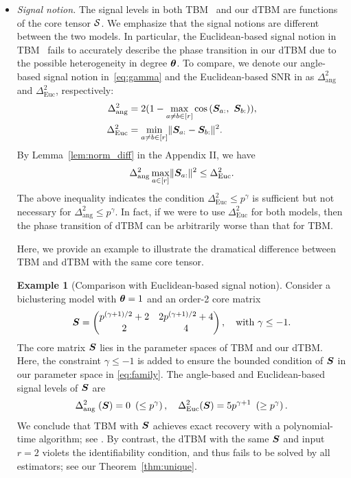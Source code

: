 \documentclass[journal]{IEEEtran}
\theoremstyle{definition}
\theoremstyle{definition}
\newtheorem{example}{Example}
\newcommand{\of}[1]{\left(#1\right)}
\begin{document}
\begin{itemize}[wide]
    \item \textit{Signal notion.} The signal levels in both TBM~\citep{han2020exact} and our dTBM are functions of the core tensor $\mathcal{S}$. We emphasize that the signal notions are different between the two models. In particular, the Euclidean-based signal notion in TBM~\cite{han2020exact} fails to accurately describe the phase transition in our dTBM due to the possible heterogeneity in degree $\boldsymbol{\theta}$. To compare, we denote our angle-based signal notion in~\eqref{eq:gamma} and the Euclidean-based SNR in \cite{han2020exact} as $\Delta_{\text{ang}}^2$ and $\Delta_{\text{Euc}}^2$, respectively:
    \begin{align}
        \Delta_{\text{ang}}^2 &=  2(1 - \max_{a \neq b\in [r]}\cos \of{\mS_{a:},\  \mS_{b:}} ), \\ 
 \Delta_{\text{Euc}}^2 &= \min_{a \neq b \in [r]} \onormSize{}{\mS_{a:} - \mS_{b:}}^2.
    \end{align}
By Lemma~\ref{lem:norm_diff} in the Appendix II, we have 
\begin{equation}\label{eq:signalcompare}
     \Delta_{\text{ang}}^2  \max_{a \in [r]}\onormSize{}{\mS_{a:}}^2 \leq \Delta_{\text{Euc}}^2.
\end{equation}
The above inequality indicates the condition $\Delta_{\text{Euc}}^2 \leq p^{\gamma}$ is sufficient but not necessary for $\Delta_{\text{ang}}^2 \leq p^{\gamma}$. In fact, if we were to use $\Delta_{\text{Euc}}^2$ for both models, then the phase transition of dTBM can be arbitrarily worse than that for TBM. 


Here, we provide an example to illustrate the dramatical difference between TBM and dTBM with the same core tensor.  

\begin{example}[Comparison with Euclidean-based signal notion] \label{example:euc_alg} Consider a biclustering model with $\boldsymbol{\theta}=1$ and an order-2 core matrix 
\begin{equation}
    \bm S = \begin{pmatrix} p^{(\gamma+1)/2 } + 2  & 2 p^{(\gamma+1)/2} + 4\\
    2 & 4
    \end{pmatrix},\quad \text{with}\ \gamma \leq -1.
\end{equation}
The core matrix $\bm S$ lies in the parameter spaces of TBM and our dTBM. Here, the constraint $\gamma \leq -1$ is added to ensure the bounded condition of $\bm S$ in our parameter space in \eqref{eq:family}. The angle-based and Euclidean-based signal levels of $\bm S$ are 
\begin{equation}
    \Delta_{\text{ang }}^2(\mS) = 0 \ \left(\leq p^{\gamma}\right), \quad \Delta_{\text{Euc}}^2(\mS) = 5 p^{\gamma + 1} \ \left(\geq p^{\gamma}\right).
\end{equation}
We conclude that TBM with $\bm S$ achieves exact recovery with a polynomial-time algorithm; see \cite[Theorem 4]{han2020exact}. By contrast, the dTBM with the same $\bm S$ and input $r=2$ violets the identifiability condition, and thus fails to be solved by all estimators; see our Theorem~\ref{thm:unique}. 
\end{example}
    

\end{itemize}
\end{document}
